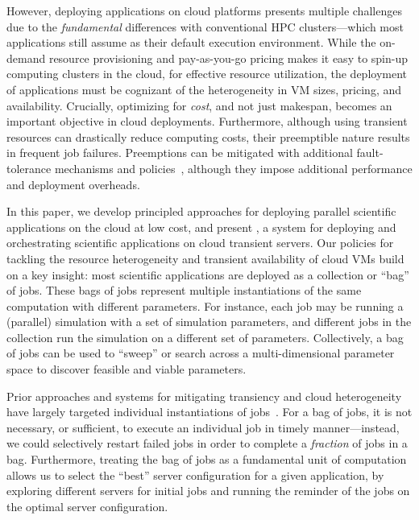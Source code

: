 
However, deploying applications on cloud platforms presents multiple challenges due to the  \emph{fundamental} differences with conventional HPC clusters---which most applications still assume as their default execution environment. 
%
While the on-demand resource provisioning and pay-as-you-go pricing makes it easy to spin-up computing clusters in the cloud, for effective resource utilization, the deployment of applications must be cognizant of the heterogeneity in VM sizes, pricing, and availability.
%
Crucially, optimizing for \emph{cost}, and not just makespan, becomes an important objective in cloud deployments. 
% 
Furthermore, although using transient resources can drastically reduce computing costs, their preemptible nature results in frequent job failures.
%
Preemptions can be mitigated with additional fault-tolerance mechanisms and policies~\cite{flint, marathe2014exploiting}, although they impose additional performance and deployment overheads. 



In this paper, we develop principled approaches for deploying parallel scientific applications on the cloud at low cost, and present \sysname, a system for deploying and orchestrating scientific applications on cloud transient servers. 
%
%
Our policies for tackling the resource heterogeneity and transient availability of cloud VMs build on a key insight: most scientific applications are deployed as a collection or ``bag'' of jobs. 
%
These bags of jobs represent multiple instantiations of the same computation with different parameters. 
%
For instance, each job may be running a (parallel) simulation with a set of simulation parameters, and different jobs in the collection run the simulation on a different set of parameters. 
Collectively, a bag of jobs can be used to ``sweep'' or search across a multi-dimensional parameter space to discover feasible and viable parameters.



Prior approaches and systems for mitigating transiency and cloud heterogeneity have largely targeted individual instantiations of jobs~\cite{spoton, exosphere, flint, marathe2014exploiting}. 
%
For a bag of jobs, it is not necessary, or sufficient, to execute an individual job in timely manner---instead, we could selectively restart failed jobs in order to complete a \emph{fraction} of jobs in a bag. 
%
Furthermore, treating the bag of jobs as a fundamental unit of computation allows us to select the ``best'' server configuration for a given application, by exploring different servers for initial jobs and running the reminder of the jobs on the optimal server configuration. 


